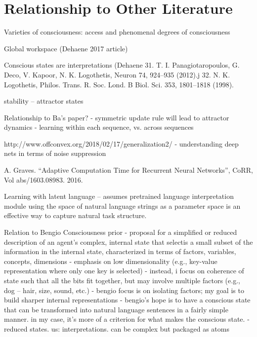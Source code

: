 \documentclass{article}
\begin{document}
\section{Relationship to Other Literature}


Varieties of consciousness:  access and phenomenal
degrees of consciousness

Global workspace (Dehaene 2017 article)

Conscious states are interpretations 
(Dehaene 
31. T. I. Panagiotaropoulos, G. Deco, V. Kapoor, N. K. Logothetis,
Neuron 74, 924–935 (2012).j
32. N. K. Logothetis, Philos. Trans. R. Soc. Lond. B Biol. Sci. 353,
1801–1818 (1998).

stability -- attractor states

Relationship to Ba's paper?
- symmetric update rule will lead to attractor dynamics
- learning within each sequence, vs. across sequences

http://www.offconvex.org/2018/02/17/generalization2/
- understanding deep nets in terms of noise suppression

A. Graves. “Adaptive Computation Time for Recurrent Neural Networks”, CoRR, Vol abs/1603.08983. 2016.

 \cite{AndreasKleinLevine2017}
 Learning with latent language -- assumes pretrained language interpretation
 module
 using the space of natural language strings as a parameter space is an effective way to capture natural task structure.



Relation to Bengio Consciousness prior
- proposal for a simplified or reduced description of an agent's complex, 
internal state that selectis a small subset of the information in the internal 
state, characterized in terms of factors, variables, concepts, dimensions
- emphasis on low dimensionality (e.g., key-value representation where only
one key is selected)
- instead, i focus on coherence of state such that all the bits fit together,
  but may involve multiple factors (e.g., dog -- hair, size, sound, etc.)
- bengio focus is on isolating factors; my goal is to build sharper internal
representations
- bengio's hope is to have a conscious state that can be transformed into
natural language sentences in a fairly simple manner.  in my case, it's more
of a criterion for what makes the conscious state.
- reduced states. us: interpretations. can be complex but packaged as atoms
\end{document}
